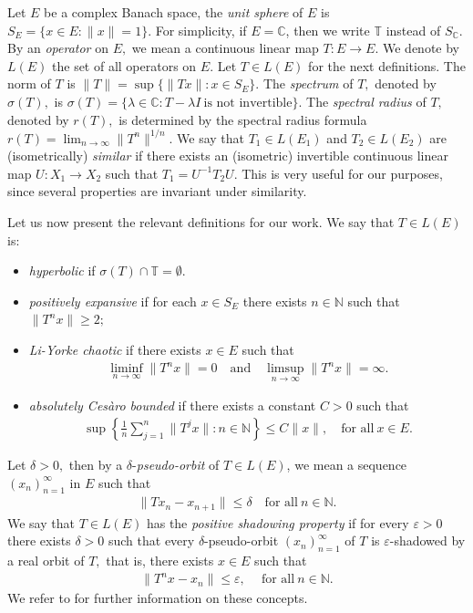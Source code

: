 \documentclass[11pt]{amsart}%
\numberwithin{equation}{section}
\theoremstyle{plain}
\theoremstyle{definition}
\theoremstyle{definition}
\begin{document}
Let $E$ be a complex Banach space, the \textit{unit sphere} of $E$ is $S_{E}=\{x\in E:\|x\|=1\}.$ For simplicity, if $E=\mathbb{C}$, then we write $\mathbb{T}$ instead of $S_{\mathbb{C}}.$ By an \textit{operator} on $E,$ we mean a continuous linear map $T:E\to E.$ We denote by $L(E)$ the set of all operators on $E.$ Let $T\in L(E)$ for the next definitions. The norm of $T$ is $\|T\|=\sup\{\|Tx\|: x\in S_E\}.$ The \textit{spectrum}  of $T,$ denoted by $\sigma(T),$ is $\sigma(T)=\{  \lambda \in \mathbb{C}: T-\lambda I \ \text{is not invertible} \}.$  The \textit{spectral radius} of $T,$ denoted by $r(T),$ is determined by the spectral radius formula $r(T)=\lim_{n\to \infty}  \|T^n\|^{1/n}.$ We say that   $T_1\in L(E_1)$ and $T_2\in L(E_2)$ are (isometrically) \textit{similar} if there exists an  (isometric) invertible continuous linear map $U:X_1\to X_2$ such that $T_1=U^{-1}T_2U.$ This is very useful for our purposes, since several properties are invariant under similarity. 


Let us now present the relevant definitions for our work. We say that $T\in L(E)$ is:
\begin{itemize}

\item  \textit{hyperbolic} if $\sigma(T)\cap \mathbb{T}=\emptyset.$

\item \textit{positively expansive} if for each $x\in S_{E}$ there exists  $n\in \mathbb{N}$ such that $\|T^nx\|\geq 2;$

\item \textit{Li-Yorke chaotic} if there exists $x\in E$ such that
\begin{align*}
\displaystyle\liminf_{n\to \infty}\|T^nx\|=0 \quad \text{and} 
\quad \displaystyle\limsup_{n\to \infty}\|T^nx\|=\infty.
\end{align*}


\item \textit{absolutely Cesàro bounded} if there exists a constant $C>0$ such that 
\begin{align*}
\sup\left\lbrace\frac{1}{n}\sum_{j=1}^n\|T^jx\|:n\in \mathbb{N}\right\rbrace\leq C\|x\|, \quad \text{for all} \ x\in E. 
\end{align*}
\end{itemize}
Let $\delta>0,$ then by a $\delta$-\textit{pseudo-orbit} of $T\in L(E)$, we mean a sequence $(x_n)_{n=1}^{\infty}$ in $E$ such that
\begin{align*}
\|Tx_n-x_{n+1}\|\leq \delta \quad \text{for all} \ n\in \mathbb{N}. 
\end{align*}
We say that $T\in L(E)$ has the \textit{positive shadowing property}  if for every $\varepsilon>0$ there exists $\delta>0$ such that every $\delta$-pseudo-orbit $(x_n)_{n =1}^{\infty}$ of $T$ is $\varepsilon$-shadowed  by a real orbit of $T,$ that is, there exists $ x \in E$ such that 
\begin{align*}
\|T^nx-x_n\|\leq \varepsilon, \quad \ \text{for all} \ n\in \mathbb{N}.
\end{align*} 
 We refer to \cite{Abadias, Bermudez,Bernardes-Bonilla, Bernardes} for further information on these concepts.
\end{document}
